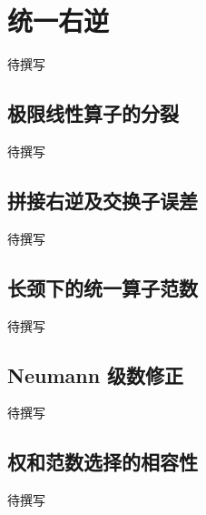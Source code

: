 
% 
% 

\section{统一右逆}
\label{g4:sec:2603}

待撰写

\subsection{极限线性算子的分裂}
\label{g4:subsec:2603:01}
待撰写

\subsection{拼接右逆及交换子误差}
\label{g4:subsec:2603:02}
待撰写

\subsection{长颈下的统一算子范数}
\label{g4:subsec:2603:03}
待撰写

\subsection{Neumann 级数修正}
\label{g4:subsec:2603:04}
待撰写

\subsection{权和范数选择的相容性}
\label{g4:subsec:2603:05}
待撰写
